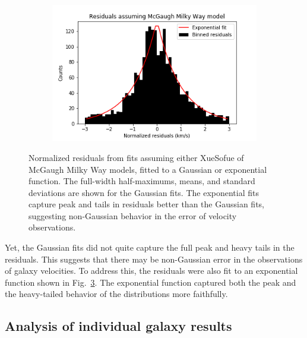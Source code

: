 \documentclass[reprint,%
 amsmath,amssymb,
 aps,
]{revtex4-1}
\begin{document}
\begin{figure}[h]
\begin{subfigure}[b]{0.475\textwidth}
         \label{fig:XueSofue residuals exponential fit}
     \end{subfigure}
     \begin{subfigure}[b]{0.475\textwidth}
         \centering
         \includegraphics[width=.8\linewidth]{figures/ResidualHist_ExpFit_v1_sinh_v2_cosh_sparc128_newnorm_McGaugh}
         \label{fig:McGaugh residuals exponential fit}
     \end{subfigure}
        \caption{Normalized residuals from fits assuming either XueSofue of McGaugh Milky Way models, fitted to a Gaussian or exponential function. The full-width half-maximums, means, and standard deviations are shown for the Gaussian fits. The exponential fits capture peak and tails in residuals better than the Gaussian fits, suggesting non-Gaussian behavior in the error of velocity observations.}
        \label{fig:residual graphs}
\end{figure}
Yet, the Gaussian fits did not quite capture the full peak and heavy tails in the residuals. This suggests that there may be non-Gaussian error in the observations of galaxy velocities. To address this, the residuals were also fit to an exponential function shown in Fig.~\ref{fig:residual graphs}. The exponential function captured both the peak and the heavy-tailed behavior of the distributions more faithfully.



 \subsection{ Analysis of individual galaxy results}
 \label{results:MtoL}
 
\end{document}
